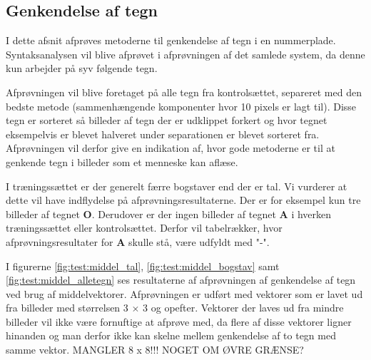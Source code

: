 
\subsection{Genkendelse af tegn}
I dette afsnit afprøves metoderne til genkendelse af tegn i en nummerplade. Syntaksanalysen vil blive afprøvet i afprøvningen af det samlede system, da denne kun arbejder på syv følgende tegn.

Afprøvningen vil blive foretaget på alle tegn fra kontrolsættet, separeret med den bedste metode (sammenhængende komponenter hvor 10 pixels er lagt til). Disse tegn er sorteret så billeder af tegn der er udklippet forkert og hvor tegnet eksempelvis er blevet halveret under separationen er blevet sorteret fra. Afprøvningen vil derfor give en indikation af, hvor gode metoderne er til at genkende tegn i billeder som et menneske kan aflæse.

I træningssættet er der generelt færre bogstaver end der er tal. Vi vurderer at dette vil have indflydelse på afprøvningsresultaterne. Der er for eksempel kun tre billeder af tegnet \textbf{O}. Derudover er der ingen billeder af tegnet \textbf{A} i hverken træningssættet eller kontrolsættet. Derfor vil tabelrækker, hvor afprøvningsresultater for \textbf{A} skulle stå, være udfyldt med "-".


I figurerne \vref{fig:test:middel_tal}, \vref{fig:test:middel_bogstav} samt \vref{fig:test:middel_alletegn} ses resultaterne af afprøvningen af genkendelse af tegn ved brug af middelvektorer. Afprøvningen er udført med vektorer som er lavet ud fra billeder med størrelsen 3 $\times$ 3 og opefter. Vektorer der laves ud fra mindre billeder vil ikke være fornuftige at afprøve med, da flere af disse vektorer ligner hinanden og man derfor ikke kan skelne mellem genkendelse af to tegn med samme vektor. MANGLER 8 x 8!!! NOGET OM ØVRE GRÆNSE?

